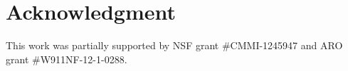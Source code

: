 \documentclass{article}
\begin{document}
%
%

\section*{Acknowledgment}
This work was partially supported by NSF grant \#CMMI-1245947 and ARO
grant \#W911NF-12-1-0288.

%

\end{document}

